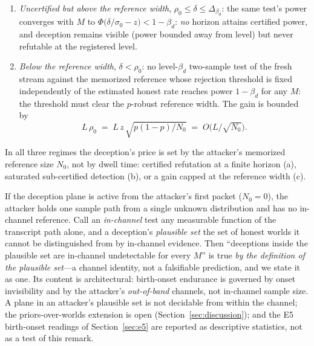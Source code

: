 \begin{theorem}
\begin{enumerate}[label=(\roman*),leftmargin=2em]
\begin{enumerate}[label=(\alph*),leftmargin=2em]
        reference draws has power $0.850$ at $(10,0.4)$ and $0.785$ at
        $(40,0.2)$ (one-sided normal analogue $0.868$), and a test on
        those draws alone cannot grow with $M$.
  \item \emph{Uncertified but above the reference width},
        $\rho_0\le\delta\le\Delta_{\beta_d}$: the same test's power
        converges with $M$ to
        $\Phi\!\bigl(\delta/\sigma_0-z\bigr)<1-\beta_d$: \emph{no} horizon
        attains certified power, and deception remains visible (power
        bounded away from level) but never refutable at the registered
        level.
  \item \emph{Below the reference width}, $\delta<\rho_0$: no
        level-$\beta_d$ two-sample test of the fresh stream against the
        memorized reference whose rejection threshold is fixed
        independently of the estimated honest rate reaches power
        $1-\beta_d$ for any $M$: the threshold must clear the $p$-robust
        reference width. The gain is bounded by
        \[
        L\,\rho_0\;=\;L\,z\,\sqrt{p(1-p)/N_0}
        \;=\;O\bigl(L/\sqrt{N_0}\bigr).
        \]
  \end{enumerate}
  In all three regimes the deception's price is set by the attacker's
  memorized reference size $N_0$, not by dwell time: certified refutation
  at a finite horizon (a), saturated sub-certified detection (b), or a
  gain capped at the reference width (c).
\end{enumerate}
\end{theorem}

\begin{remark}\label{rem:birth}
If the deception plane is active from the attacker's first packet
($N_0=0$), the attacker holds one sample path from a single unknown
distribution and has no in-channel reference. Call an \emph{in-channel}
test any measurable function of the transcript path alone, and a
deception's \emph{plausible set} the set of honest worlds it cannot be
distinguished from by in-channel evidence. Then ``deceptions inside the
plausible set are in-channel undetectable for every $M$'' is true
\emph{by the definition of the plausible set}---a channel identity, not a
falsifiable prediction, and we state it as one. Its content is
architectural: birth-onset endurance is governed by onset invisibility
and by the attacker's \emph{out-of-band} channels, not in-channel
sample size. A plane in an attacker's plausible set is not decidable
from within the channel; the
priors-over-worlds extension is open (Section~\ref{sec:discussion}); and
the E5 birth-onset readings of Section~\ref{sec:e5} are reported as
descriptive statistics, not as a test of this remark.
\end{remark}

